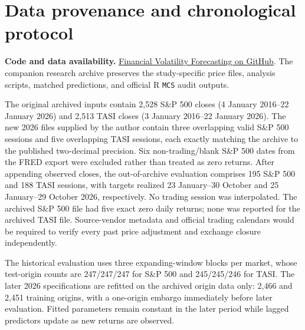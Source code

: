 \section{Data provenance and chronological protocol}
\noindent\textbf{Code and data availability.} \href{https://github.com/alrashedinaifrr/financial-volatility-forecasting}{Financial Volatility Forecasting on GitHub}. The companion research archive preserves the study-specific price files, analysis scripts, matched predictions, and official R \texttt{MCS} audit outputs.\par\smallskip
The original archived inputs contain 2,528 S\&P 500 closes (4 January 2016--22 January 2026) and 2,513 TASI closes (3 January 2016--22 January 2026). The new 2026 files supplied by the author contain three overlapping valid S\&P 500 sessions and five overlapping TASI sessions, each exactly matching the archive to the published two-decimal precision. Six non-trading/blank S\&P 500 dates from the FRED export were excluded rather than treated as zero returns. After appending observed closes, the out-of-archive evaluation comprises 195 S\&P 500 and 188 TASI sessions, with targets realized 23 January--30 October and 25 January--29 October 2026, respectively. No trading session was interpolated. The archived S\&P 500 file had five exact zero daily returns; none was reported for the archived TASI file. Source-vendor metadata and official trading calendars would be required to verify every past price adjustment and exchange closure independently.

The historical evaluation uses three expanding-window blocks per market, whose test-origin counts are 247/247/247 for S\&P 500 and 245/245/246 for TASI. The later 2026 specifications are refitted on the archived origin data only: 2,466 and 2,451 training origins, with a one-origin embargo immediately before later evaluation. Fitted parameters remain constant in the later period while lagged predictors update as new returns are observed.

